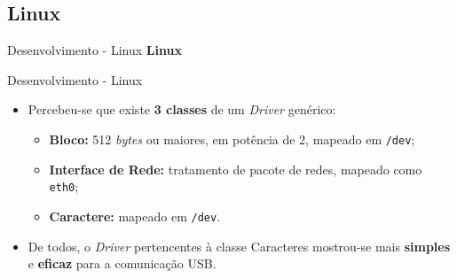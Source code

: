 	\subsection{Linux}
	\begin{frame}{Desenvolvimento - Linux}
		\centering \color{blue} {\Huge \textbf{Linux} \\[0.5cm]}
	\end{frame}
	\begin{frame}{Desenvolvimento - Linux}
		\begin{itemize}
			\setlength\itemsep{2em}
			\item Percebeu-se que existe \textbf{3 classes} de um \textit{Driver} genérico:
			\begin{itemize}
				\setlength\itemsep{1em}
				\item \textbf{Bloco:} 512 \textit{bytes} ou maiores, em potência de 2, mapeado em \texttt{/dev};
				\item \textbf{Interface de Rede:} tratamento de pacote de redes, mapeado como \texttt{eth0};
				\item \textbf{Caractere:} mapeado em \texttt{/dev}.
			\end{itemize}
			\item De todos, o \textit{Driver} pertencentes à classe Caracteres mostrou-se mais \textbf{simples} e \textbf{eficaz} para a comunicação USB.
		\end{itemize}
	\end{frame}
